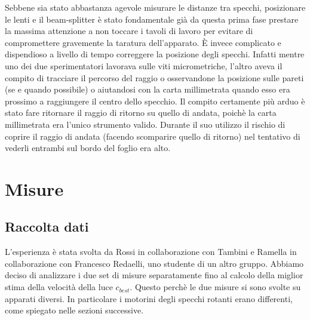 \documentclass{article}
\begin{document}
Sebbene sia stato abbastanza agevole misurare le distanze tra specchi, posizionare le lenti e il beam-splitter è stato fondamentale già da questa prima fase prestare la 
massima attenzione a non toccare i tavoli di lavoro per evitare di compromettere gravemente la taratura dell'apparato.
È invece complicato e dispendioso a livello di tempo correggere la posizione degli specchi. Infatti mentre uno dei due sperimentatori lavorava sulle viti micrometriche,
l'altro aveva il compito di tracciare il percorso del raggio o osservandone la posizione sulle pareti (se e quando possibile) o aiutandosi con la carta millimetrata 
quando esso era prossimo a raggiungere il centro dello specchio.
Il compito certamente più arduo è stato fare ritornare il raggio di ritorno su quello di andata, poichè la carta millimetrata era l'unico strumento valido. Durante il suo utilizzo
il rischio di coprire il raggio di andata (facendo scomparire quello di ritorno) nel tentativo di vederli entrambi sul bordo del foglio era alto.


\newpage

\section{Misure}

\subsection{Raccolta dati} \label{raccolta_dati}
L'esperienza è stata svolta da Rossi in collaborazione con Tambini e Ramella in collaborazione con Francesco Redaelli, uno studente di un altro gruppo. 
Abbiamo deciso di analizzare i due set di misure separatamente fino al calcolo della miglior stima della velocità della luce $c_{best}$. Questo perchè le due misure si 
sono svolte su apparati diversi. In particolare i motorini degli specchi rotanti erano differenti, come spiegato nelle sezioni successive.

\end{document}
